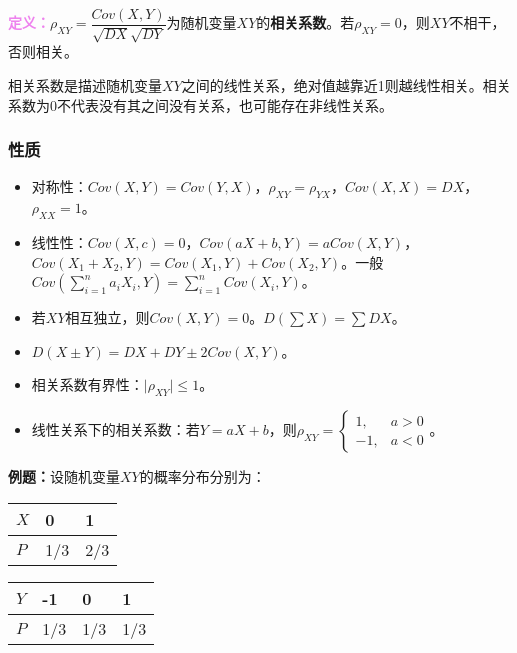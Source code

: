 \documentclass[UTF8, 12pt]{ctexart}
\begin{document}
\textcolor{violet}{\textbf{定义：}}$\rho_{XY}=\dfrac{Cov(X,Y)}{\sqrt{DX}\sqrt{DY}}$为随机变量$XY$的\textbf{相关系数}。若$\rho_{XY}=0$，则$XY$不相干，否则相关。

相关系数是描述随机变量$XY$之间的线性关系，绝对值越靠近1则越线性相关。相关系数为0不代表没有其之间没有关系，也可能存在非线性关系。

\subsubsection{性质}

\begin{itemize}
    \item 对称性：$Cov(X,Y)=Cov(Y,X)$，$\rho_{XY}=\rho_{YX}$，$Cov(X,X)=DX$，$\rho_{XX}=1$。
    \item 线性性：$Cov(X,c)=0$，$Cov(aX+b,Y)=aCov(X,Y)$，$Cov(X_1+X_2,Y)=Cov(X_1,Y)+Cov(X_2,Y)$。一般$Cov\left(\sum\limits_{i=1}^na_iX_i,Y\right)=\sum\limits_{i=1}^nCov(X_i,Y)$。
    \item 若$XY$相互独立，则$Cov(X,Y)=0$。$D(\sum X)=\sum DX$。
    \item $D(X\pm Y)=DX+DY\pm2Cov(X,Y)$。
    \item 相关系数有界性：$\vert\rho_{XY}\vert\leqslant1$。
    \item 线性关系下的相关系数：若$Y=aX+b$，则$\rho_{XY}=\left\{\begin{array}{ll}
        1, & a>0 \\
        -1, & a<0
    \end{array}\right.$。
\end{itemize}

\textbf{例题：}设随机变量$XY$的概率分布分别为：

\begin{center}
    \begin{tabular}{m{20pt}<{\centering}|m{40pt}<{\centering}m{40pt}<{\centering}}
        \hline
        $X$ & 0 & 1 \\ \hline
        $P$ & 1/3 & 2/3 \\ \hline
    \end{tabular}\qquad
    \begin{tabular}{m{20pt}<{\centering}|m{40pt}<{\centering}m{40pt}<{\centering}m{40pt}<{\centering}}
        \hline
        $Y$ & -1 & 0 & 1 \\ \hline
        $P$ & 1/3 & 1/3 & 1/3 \\ \hline
    \end{tabular}
\end{center}
\end{document}

